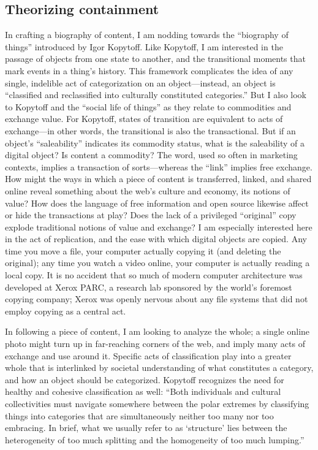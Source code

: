 \subsection{Theorizing containment}

In crafting a biography of content, I am nodding towards the “biography of things” introduced by Igor Kopytoff. Like Kopytoff, I am interested in the passage of objects from one state to another, and the transitional moments that mark events in a thing’s history. This framework complicates the idea of any single, indelible act of categorization on an object—instead, an object is “classified and reclassified into culturally constituted categories.”  But I also look to Kopytoff and the “social life of things” as they relate to commodities and exchange value. For Kopytoff, states of transition are equivalent to acts of exchange—in other words, the transitional is also the transactional. But if an object’s “saleability” indicates its commodity status, what is the saleability of a digital object? Is content a commodity? The word, used so often in marketing contexts, implies a transaction of sorts—whereas the “link” implies free exchange. How might the ways in which a piece of content is transferred, linked, and shared online reveal something about the web’s culture and economy, its notions of value? How does the language of free information and open source likewise affect or hide the transactions at play? Does the lack of a privileged “original” copy explode traditional notions of value and exchange? I am especially interested here in the act of replication, and the ease with which digital objects are copied. Any time you move a file, your computer actually copying it (and deleting the original); any time you watch a video online, your computer is actually reading a local copy. It is no accident that so much of modern computer architecture was developed at Xerox PARC, a research lab sponsored by the world’s foremost copying company; Xerox was openly nervous about any file systems that did not employ copying as a central act. 

In following a piece of content, I am looking to analyze the whole; a single online photo might turn up in far-reaching corners of the web, and imply many acts of exchange and use around it. Specific acts of classification play into a greater whole that is interlinked by societal understanding of what constitutes a category, and how an object should be categorized. Kopytoff recognizes the need for healthy and cohesive classification as well: “Both individuals and cultural collectivities must navigate somewhere between the polar extremes by classifying things into categories that are simultaneously neither too many nor too embracing. In brief, what we usually refer to as ‘structure’ lies between the heterogeneity of too much splitting and the homogeneity of too much lumping.” 

